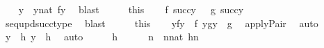 \begin{isabellebody}
\ \ \isamarkupfalse%
\ y\ \ {\isachardoublequoteopen}y{\isasymin}nat{\isachardoublequoteclose}\ {\isachardoublequoteopen}f{\isacharcolon}{\kern0pt}y{\isasymrightarrow}{}{\isachardoublequoteclose}\ \isamarkupfalse%
\ blast\isanewline
\ \ \isamarkupfalse%
\ \isamarkupfalse%
\ this\isanewline
\ \ \isamarkupfalse%
\ {\isachardoublequoteopen}{\isacharquery}{\kern0pt}f{\isacharcolon}{\kern0pt}\ succ{\isacharparenleft}{\kern0pt}y{\isacharparenright}{\kern0pt}\ {\isasymrightarrow}\ {}{\isachardoublequoteclose}\ {\isachardoublequoteopen}{\isacharquery}{\kern0pt}g{\isacharcolon}{\kern0pt}\ succ{\isacharparenleft}{\kern0pt}y{\isacharparenright}{\kern0pt}\ {\isasymrightarrow}\ {}{\isachardoublequoteclose}\ \isanewline
\ \ \ \ \isamarkupfalse%
\ seq{\isacharunderscore}{\kern0pt}upd{\isacharunderscore}{\kern0pt}succ{\isacharunderscore}{\kern0pt}type\ \isamarkupfalse%
\ blast{\isacharplus}{\kern0pt}\isanewline
\ \ \isamarkupfalse%
\ \isamarkupfalse%
\ this\isanewline
\ \ \isamarkupfalse%
\ {\isachardoublequoteopen}{\isasymlangle}y{\isacharcomma}{\kern0pt}{\isacharquery}{\kern0pt}f{\isacharbackquote}{\kern0pt}y{\isasymrangle}\ {\isasymin}\ {\isacharquery}{\kern0pt}f{\isachardoublequoteclose}\ {\isachardoublequoteopen}{\isasymlangle}y{\isacharcomma}{\kern0pt}{\isacharquery}{\kern0pt}g{\isacharbackquote}{\kern0pt}y{\isasymrangle}\ {\isasymin}\ {\isacharquery}{\kern0pt}g{\isachardoublequoteclose}\ \isamarkupfalse%
\ apply{\isacharunderscore}{\kern0pt}Pair\ \isamarkupfalse%
\ auto\isanewline
\ \ \isamarkupfalse%
\isanewline
\ \ \isamarkupfalse%
\ {\isachardoublequoteopen}{\isasymlangle}y{\isacharcomma}{\kern0pt}{}{\isasymrangle}\ {\isasymin}\ h{\isachardoublequoteclose}\ {\isachardoublequoteopen}{\isasymlangle}y{\isacharcomma}{\kern0pt}{}{\isasymrangle}\ {\isasymin}\ h{\isachardoublequoteclose}\ \isamarkupfalse%
\ auto\isanewline
\ \ \isamarkupfalse%
\ \isamarkupfalse%
\ {\isacartoucheopen}h\ {\isasymin}\ {}{\isacharcircum}{\kern0pt}{\isacharless}{\kern0pt}{\isasymomega}{\isacartoucheclose}\isanewline
\ \ \isamarkupfalse%
\ n\ \ {\isachardoublequoteopen}n{\isasymin}nat{\isachardoublequoteclose}\ {\isachardoublequoteopen}h{\isacharcolon}{\kern0pt}n{\isasymrightarrow}{}{\isachardoublequoteclose}\ \isamarkupfalse%

\end{isabellebody}
